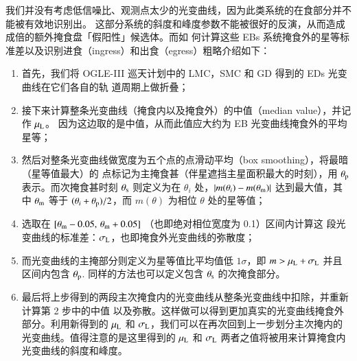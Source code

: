 我们并没有考虑低信噪比、观测点太少的光变曲线，因为此类系统的在食部分并不能被有效地识别出。
这部分系统的斜度和峰度参数不能被很好的反演，从而造成成倍的额外掩食盘「假阳性」候选体。而如
何计算这些 EBs 系统掩食外的星等标准差以及识别进食（ingress）和出食（egress）粗略介绍如下：


\begin{enumerate}
\item 首先，我们将 OGLE-III 巡天计划中的 LMC，SMC 和 GD 得到的 EDs 光变曲线在它们各自的轨
道周期\cite{Graczyk2011,Pawlak2013,Pietrukowicz2013}上做折叠；

\item 接下来计算整条光变曲线（掩食内以及掩食外）的中值（median value），并记作 $\mu_\mathrm{L}$。
因为这边取的是中值，从而此值应大约为 EB 光变曲线掩食外的平均星等；

\item 然后对整条光变曲线做宽度为五个点的点滑动平均（box smoothing），将最暗（星等值最大）的
点标记为主掩食甚（伴星遮挡主星面积最大的时刻），用 $\theta_\mathrm{p}$ 表示。而次掩食甚时刻 $
\theta_\mathrm{s}$ 则定义为在 $\theta_i$ 处，$|m(\theta_i) - m(\theta_\mathrm{m})|$ 达到最大值，其中 $
\theta_\mathrm{m}$ 等于 $(\theta_i+ \theta_\mathrm{p})/2$，而 $m(\theta)$ 为相位 $\theta$ 处的星等值；

\item 选取在 $[\theta_\mathrm{m} - 0.05, \, \theta_\mathrm{m} + 0.05]$ （也即绝对相位宽度为 0.1）区间内计算这
段光变曲线的标准差：$\sigma_\mathrm{L}$，也即掩食外光变曲线的弥散度；

\item 而光变曲线的主掩部分则定义为星等值比平均值低 $1\sigma$，即 $m > \mu_\mathrm{L} + \sigma_\mathrm{L}
$ 并且区间内包含 $\theta_\mathrm{p}$. 同样的方法也可以定义包含 $\theta_\mathrm{s}$ 的次掩食部分。

\item 最后将上步得到的两段主次掩食内的光变曲线从整条光变曲线中扣除，并重新计算第 2 步中的中值
以及弥散。这样做可以得到更加真实的光变曲线掩食外部分。利用新得到的 $\mu_\mathrm{L}$ 和 $\sigma_
\mathrm{L}$，我们可以在再次回到上一步划分主次掩内的光变曲线。值得注意的是这里得到的 $\mu_\mathrm{L}$ 
和 $\sigma_\mathrm{L}$ 两者之值将被用来计算掩食内光变曲线的斜度和峰度。
\end{enumerate}

